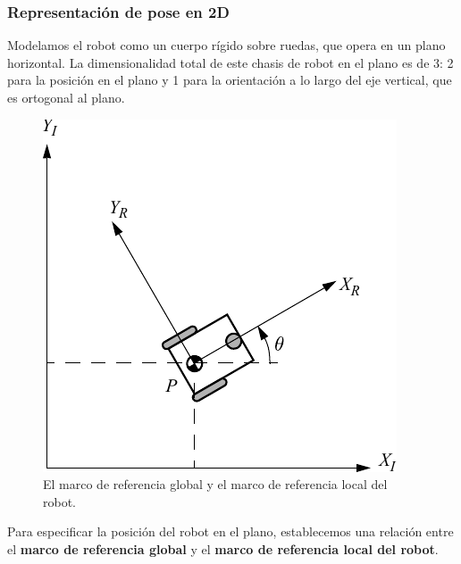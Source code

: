 \begin{frame}
    \frametitle{Representación de pose en 2D}
    \footnotesize
    Modelamos el robot como un cuerpo rígido sobre ruedas, que opera en un plano horizontal. La dimensionalidad total de este chasis de robot en el plano es de 3: 2 para la posición en el plano y 1 para la orientación a lo largo del eje vertical, que es ortogonal al plano.

    \begin{figure}[!h]
        \includegraphics[width=0.4\columnwidth]{./images/coordinate_systems.pdf}
        \caption{El marco de referencia global y el marco de referencia local del robot.}
    \end{figure}

    Para especificar la posición del robot en el plano, establecemos una relación entre el {\bf marco de referencia global} y el {\bf marco de referencia local del robot}.

\end{frame}


